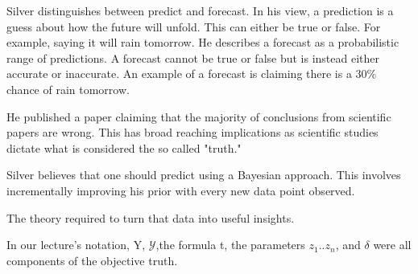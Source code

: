 \documentclass[12pt]{article}
\begin{document}

\begin{enumerate}


Silver distinguishes between predict and forecast. In his view, a prediction is a guess about how the future will unfold. This can either be true or false. For example, saying it will rain tomorrow. He describes a forecast as a probabilistic range of predictions. A forecast cannot be true or false but is instead either accurate or inaccurate. An example of a forecast is claiming there is a $30\%$ chance of rain tomorrow.


He published a paper claiming that the majority of conclusions from scientific papers are wrong. This has broad reaching implications as scientific studies dictate what is considered the so called "truth."



Silver believes that one should predict using a Bayesian approach. This involves incrementally improving his prior with every new data point observed. 


The theory required to turn that data into useful insights. 


In our lecture's notation, Y, $\mathcal{Y}$,the formula t, the parameters $z_1..z_n$, and $\delta$ were all components of the objective truth. 



\end{enumerate}
\end{document}
